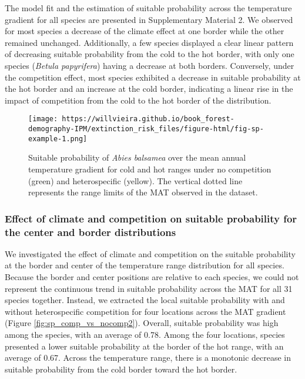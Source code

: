 \documentclass[12pt]{article}
\begin{document}
The model fit and the estimation of suitable probability across the
temperature gradient for all species are presented in Supplementary
Material 2. We observed for most species a decrease of the climate
effect at one border while the other remained unchanged. Additionally, a
few species displayed a clear linear pattern of decreasing suitable
probability from the cold to the hot border, with only one species
(\emph{Betula papyrifera}) having a decrease at both borders.
Conversely, under the competition effect, most species exhibited a
decrease in suitable probability at the hot border and an increase at
the cold border, indicating a linear rise in the impact of competition
from the cold to the hot border of the distribution.

\begin{figure}
\hypertarget{fig:sp-example}{%
\centering
\texttt{[image: https://willvieira.github.io/book\_forest-demography-IPM/extinction\_risk\_files/figure-html/fig-sp-example-1.png]}
\caption{Suitable probability of \emph{Abies balsamea} over the mean
annual temperature gradient for cold and hot ranges under no competition
(green) and heterospecific (yellow). The vertical dotted line represents
the range limits of the MAT observed in the
dataset.}\label{fig:sp-example}
}
\end{figure}

\hypertarget{effect-of-climate-and-competition-on-suitable-probability-for-the-center-and-border-distributions}{%
\subsubsection{Effect of climate and competition on suitable probability
for the center and border
distributions}\label{effect-of-climate-and-competition-on-suitable-probability-for-the-center-and-border-distributions}}

We investigated the effect of climate and competition on the suitable
probability at the border and center of the temperature range
distribution for all species. Because the border and center positions
are relative to each species, we could not represent the continuous
trend in suitable probability across the MAT for all 31 species
together. Instead, we extracted the local suitable probability with and
without heterospecific competition for four locations across the MAT
gradient (Figure \ref{fig:sp_comp_vs_nocomp2}). Overall, suitable
probability was high among the species, with an average of 0.78. Among
the four locations, species presented a lower suitable probability at
the border of the hot range, with an average of 0.67. Across the
temperature range, there is a monotonic decrease in suitable probability
from the cold border toward the hot border.
\end{document}
